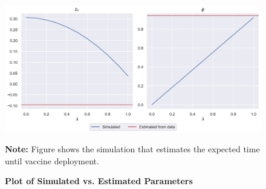 \begin{figure}[!h]
\caption{\textbf{Plot of Simulated vs. Estimated Parameters}} \label{fig:q3}
  \center \vspace{-4ex} \includegraphics[width=5.5in]{../Figures/q3}		
 \begin{minipage}[c]{\textwidth}   
  \small \textbf{Note:} Figure shows the simulation that estimates the expected time until vaccine deployment.
 \end{minipage}
\end{figure}

